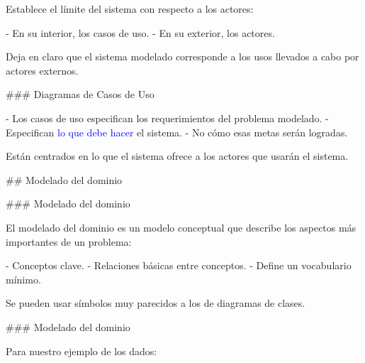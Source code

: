  Establece el límite del sistema con respecto a los actores:

- En su interior, los casos de uso.
- En su exterior, los actores.

Deja en claro que el sistema modelado corresponde a los usos llevados a cabo por actores externos.

\columnsend

### Diagramas de Casos de Uso

\newline

- Los casos de uso especifican los requerimientos del problema modelado.
- Especifican \textcolor{blue}{lo que debe hacer} el sistema.
- No cómo esas metas serán logradas.\newline

Están centrados en lo que el sistema ofrece a los actores que usarán el sistema.

## Modelado del dominio

### Modelado del dominio

El modelado del dominio es un modelo conceptual que describe los aspectos más importantes de un
problema:

- Conceptos clave.
- Relaciones básicas entre conceptos.
- Define un vocabulario mínimo.\newline

Se pueden usar símbolos muy parecidos a los de diagramas de clases.

\centering{}

### Modelado del dominio

Para nuestro ejemplo de los dados:\newline

\centering{}

